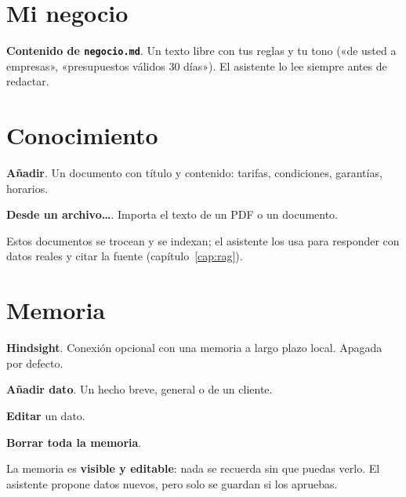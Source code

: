\section{Mi negocio}
\begin{leyenda}
\item[\mk{1}] \textbf{Contenido de \texttt{negocio.md}}. Un texto libre con tus reglas y tu tono («de usted a empresas», «presupuestos válidos 30 días»). El asistente lo lee siempre antes de redactar.
\end{leyenda}

\section{Conocimiento}
\begin{leyenda}
\item[\mk{1}] \textbf{Añadir}. Un documento con título y contenido: tarifas, condiciones, garantías, horarios.
\item[\mk{2}] \textbf{Desde un archivo…}. Importa el texto de un PDF o un documento.
\end{leyenda}
Estos documentos se trocean y se indexan; el asistente los usa para responder con datos reales y citar la fuente (capítulo~\ref{cap:rag}).

\section{Memoria}
\begin{leyenda}
\item[\mk{1}] \textbf{Hindsight}. Conexión opcional con una memoria a largo plazo local. Apagada por defecto.
\item[\mk{2}] \textbf{Añadir dato}. Un hecho breve, general o de un cliente.
\item[\mk{3}] \textbf{Editar} un dato.
\item[\mk{4}] \textbf{Borrar toda la memoria}.
\end{leyenda}
La memoria es \textbf{visible y editable}: nada se recuerda sin que puedas verlo. El asistente propone datos nuevos, pero solo se guardan si los apruebas.

